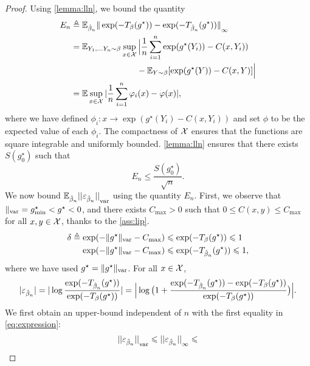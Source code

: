 \begin{proof}
Using \autoref{lemma:lln}, we bound the quantity
\begin{align}
    E_n &\triangleq \EE_{\hat \beta_n} {\Vert \exp(-\Ctrans{g^\star}{\beta})
    - \exp(-\Ctrans{g^\star}{\hat \beta_n}) \Vert}_{\infty} \\
    &= \EE_{Y_1, \dots Y_n \sim \beta} 
    \sup_{x \in \Xx}
     \Big| \frac{1}{n} \sum_{i=1}^n \exp(g^\star(Y_i)) - C(x, Y_i)) \\
      &\phantom{=}\qquad\qquad\qquad\quad- \EE_{Y \sim \beta}[\exp(g^\star(Y)) - C(x, Y)] \Big| \\
      &= \EE \sup_{x \in \Xx} | \frac{1}{n} \sum_{i=1}^n \phi_i(x) - \phi(x) | ,
\end{align}
where we have defined $\phi_i: x \to \exp(g^\star(Y_i) - C(x, Y_i))$ and set
$\phi$ to be the expected value of each $\phi_i$. The compactness of $\Xx$
ensures that the functions  are square integrable and uniformly bounded.
\autoref{lemma:lln} ensures that there exists $S(g^\star_0)$ such that
\begin{equation}
    E_n \leq \frac{S(g^\star_0)}{\sqrt{n}}.
\end{equation}
We now bound $\EE_{\hat \beta_n} {|| \epsilon_{\hat \beta_n} ||}_\var$ using the
 quantity $E_n$. First, we observe that $\Vert_{\var} = g^\star_{\min} < g^\star
 < 0$, and there exists $C_{\max} > 0$ such that $0 \leq C(x, y) \leq C_{\max}$
 for all $x, y \in \Xx$, thanks to the \autoref{ass:lip}.
 \begin{align}
    \delta \triangleq \exp(-\Vert g^\star \Vert_{\var}
     - C_{\max}) &\leq \exp(-T_\beta(g^\star)) \leq 1 \\
    \exp(-\Vert g^\star \Vert_{\var}
     - C_{\max}) &\leq \exp(-T_{\hat \beta_n} 
    (g^\star)) \leq 1,
\end{align}
where we have used $g^\star = \Vert g^\star \Vert_{\var}$.
For all $x \in \Xx$, 
\begin{equation}\label{eq:expression}
    | \epsilon_{\hat \beta_n} | = 
    | \log \frac{\exp(-T_{\hat \beta_n}(g^\star))}{\exp(-T_\beta(g^\star))} | =
    \Big| \log\big(1 + 
    \frac{\exp(-\Ctrans{g^\star}{\hat \beta_n})
    -\exp(-\Ctrans{g^\star}{\beta})
    }
    {\exp(-\Ctrans{g^\star}{\beta})}\big) \Big|.
\end{equation}
We first obtain an upper-bound independent of $n$ with the first equality in
 \eqref{eq:expression}:
\begin{equation}\label{eq:const_ineq}
    {|| \varepsilon_{\hat \beta_n} ||}_{\var} \leq {|| \varepsilon_{\hat \beta_n} ||}_{\infty} \leq 

\end{equation}
\end{proof}
